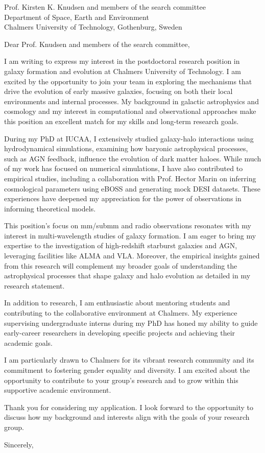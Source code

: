 \documentclass[11pt]{letter}
\begin{document}
\begin{letter}{Prof. Kirsten K. Knudsen and members of the search committee \\ Department of Space, Earth and Environment \\ Chalmers University of Technology, Gothenburg, Sweden}

\opening{Dear Prof. Knudsen and members of the search committee,}

I am writing to express my interest in the postdoctoral research position in galaxy formation and evolution at Chalmers University of Technology. I am excited by the opportunity to join your team in exploring the mechanisms that drive the evolution of early massive galaxies, focusing on both their local environments and internal processes. My background in galactic astrophysics and cosmology and my interest in computational and observational approaches make this position an excellent match for my skills and long-term research goals.

During my PhD at IUCAA, I extensively studied galaxy-halo interactions using hydrodynamical simulations, examining how baryonic astrophysical processes, such as AGN feedback, influence the evolution of dark matter haloes. While much of my work has focused on numerical simulations, I have also contributed to empirical studies, including a collaboration with Prof. Hector Marin on inferring cosmological parameters using eBOSS and generating mock DESI datasets. These experiences have deepened my appreciation for the power of observations in informing theoretical models.

This position's focus on mm/submm and radio observations resonates with my interest in multi-wavelength studies of galaxy formation. I am eager to bring my expertise to the investigation of high-redshift starburst galaxies and AGN, leveraging facilities like ALMA and VLA. Moreover, the empirical insights gained from this research will complement my broader goals of understanding the astrophysical processes that shape galaxy and halo evolution as detailed in my research statement.

In addition to research, I am enthusiastic about mentoring students and contributing to the collaborative environment at Chalmers. My experience supervising undergraduate interns during my PhD has honed my ability to guide early-career researchers in developing specific projects and achieving their academic goals.

I am particularly drawn to Chalmers for its vibrant research community and its commitment to fostering gender equality and diversity. I am excited about the opportunity to contribute to your group’s research and to grow within this supportive academic environment.

Thank you for considering my application. I look forward to the opportunity to discuss how my background and interests align with the goals of your research group.

\closing{Sincerely,}

\end{letter}
\end{document}
